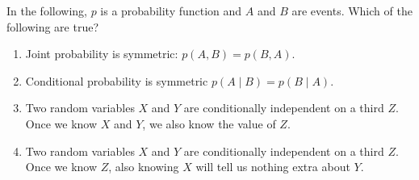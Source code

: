 \documentclass[11pt]{article}
\begin{document}
\begin{Exercise}
\noindent In the following, $p$ is a  probability function and $A$ and $B$ are events. Which of the following are true?
\begin{enumerate}
	\item Joint probability is symmetric: $p(A, B) = p(B, A)$. 
	\item Conditional probability is symmetric $p(A \mid B) = p(B \mid A)$. 
	\item Two random variables $X$ and $Y$ are conditionally independent on a third $Z$. Once we know $X$ and $Y$, we also know the value of $Z$. 
	\item Two random variables $X$ and $Y$ are conditionally independent on a third $Z$. Once we know $Z$, also knowing $X$ will tell us nothing extra about $Y$. 
\end{enumerate}	
\end{Exercise}
\end{document}
